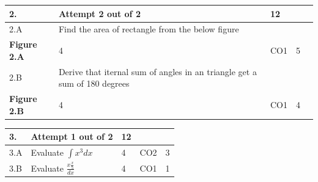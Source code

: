 \documentclass[12pt]{article}
\begin{document}
	\begin{longtable}{|L{1cm}|L{8cm}|C{1cm}|C{1cm}|C{1cm}|}\hline
	\bf2. & \bf{Attempt} \bf{2} \bf{out of} \bf{2} & \bf{12}  & & \\ \hline





		2.A &
	Find the area of rectangle from the below figure \newline
			\begin{center}
		\includegraphics[width=4cm,height=3cm]{media/diagrams/2020/09/14/rectsquare.png}\\\bf{Figure }\bf2.A		
	\end{center}
		
	 &  4 & CO1 & 5\\ \hline
		2.B &
	Derive that iternal sum of angles in an triangle get a sum of 180 degrees \newline
			\begin{center}
		\includegraphics[width=4cm,height=3cm]{media/diagrams/2020/09/14/rectsquare_k3vvwfe.png}\\\bf{Figure }\bf2.B		
	\end{center}
		
	 &  4 & CO1 & 4\\ \hline
	\end{longtable}


\begin{longtable}{|L{1cm}|L{8cm}|C{1cm}|C{1cm}|C{1cm}|}\hline
	\bf3. & \bf{Attempt} \bf{1} \bf{out of} \bf{2} & \bf{12}  & & \\ \hline





		3.A &
	Evaluate $\int x^{3}dx$ \newline
			
	 &  4 & CO2 & 3\\ \hline
		3.B &
	Evaluate $\frac{x\frac{x}{5}}{dx}$ \newline
			
	 &  4 & CO1 & 1\\ \hline
	\end{longtable}
\end{document}
